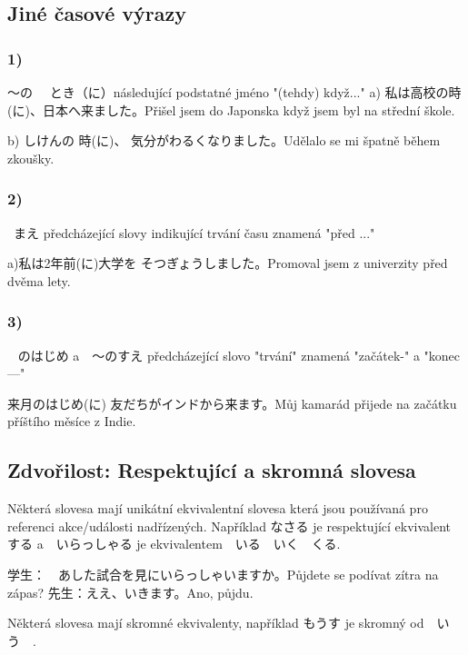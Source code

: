 \subsection{Jiné časové výrazy}
\subsubsection{1)}〜の 　とき（に）následující podstatné jméno "(tehdy) když..." 
a) 私は高校の時(に)、日本へ来ました。Přišel jsem do Japonska když jsem byl na střední škole.

b) しけんの 時(に)、 気分がわるくなりました。Udělalo se mi špatně během zkoušky.


\subsubsection{2)}~まえ předcházející slovy indikující trvání času znamená "před ..."

 a)私は2年前(に)大学を そつぎょうしました。Promoval jsem z univerzity před dvěma lety.

\subsubsection{3)} ~ のはじめ a　〜のすえ předcházející slovo "trvání" znamená "začátek-" a "konec ---"

来月のはじめ(に) 友だちがインドから来ます。Můj kamarád přijede na začátku příštího měsíce z Indie.

\subsection{Zdvořilost: Respektující a skromná slovesa}

Některá slovesa mají unikátní ekvivalentní slovesa která jsou používaná pro referenci akce/události nadřízených. Například なさる je respektující ekvivalent　する a　いらっしゃる je ekvivalentem　いる　いく　くる.

学生：　あした試合を見にいらっしゃいますか。Půjdete se podívat zítra na zápas?
先生：ええ、いきます。Ano, půjdu.

Některá slovesa mají skromné ekvivalenty, například もうす je skromný od　いう　.










